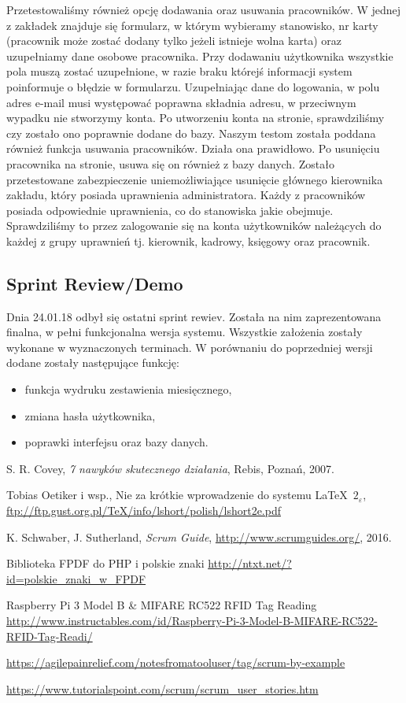 \documentclass[a4paper]{article}
\begin{document}
Przetestowaliśmy również opcję dodawania oraz usuwania pracowników. W jednej z zakładek znajduje się formularz, w którym wybieramy stanowisko, nr karty (pracownik może zostać dodany tylko jeżeli istnieje wolna karta) oraz uzupełniamy dane osobowe pracownika. Przy dodawaniu użytkownika wszystkie pola muszą zostać uzupełnione, w razie braku którejś informacji system poinformuje o błędzie w formularzu. Uzupełniając dane do logowania, w polu adres e-mail musi występować poprawna składnia adresu, w przeciwnym wypadku nie stworzymy konta. Po utworzeniu konta na stronie, sprawdziliśmy czy zostało ono poprawnie dodane do bazy. Naszym testom została poddana również funkcja usuwania pracowników. Działa ona prawidłowo. Po usunięciu pracownika na stronie, usuwa się on również z bazy danych. Zostało przetestowane zabezpieczenie uniemożliwiające usunięcie głównego kierownika zakładu, który posiada uprawnienia administratora.
Każdy z pracowników posiada odpowiednie uprawnienia, co do stanowiska jakie obejmuje. Sprawdziliśmy to przez zalogowanie się na konta użytkowników należących do każdej z grupy uprawnień tj. kierownik, kadrowy, księgowy oraz pracownik.


\subsection{Sprint Review/Demo}
Dnia 24.01.18 odbył się ostatni sprint rewiev. Została na nim zaprezentowana finalna, w pełni funkcjonalna wersja systemu. Wszystkie założenia zostały wykonane w wyznaczonych terminach. W porównaniu do poprzedniej wersji dodane zostały następujące funkcję:
\begin{itemize}
\item funkcja wydruku zestawienia miesięcznego,
\item zmiana hasła użytkownika,
\item poprawki interfejsu oraz bazy danych.
\end{itemize}


\begin{thebibliography}{9}

 S. R. Covey, {\em 7 nawyków skutecznego działania}, Rebis, Poznań, 2007.

 Tobias Oetiker i wsp., Nie za krótkie wprowadzenie do systemu \LaTeX  \ $2_\varepsilon$, \url{ftp://ftp.gust.org.pl/TeX/info/lshort/polish/lshort2e.pdf}

 K. Schwaber, J. Sutherland, {\em Scrum Guide}, \url{http://www.scrumguides.org/}, 2016.

 Biblioteka FPDF do PHP i polskie znaki \url{http://ntxt.net/?id=polskie_znaki_w_FPDF}

 Raspberry Pi 3 Model B \& MIFARE RC522 RFID Tag Reading \\ \url{http://www.instructables.com/id/Raspberry-Pi-3-Model-B-MIFARE-RC522-RFID-Tag-Readi/}

 \url{https://agilepainrelief.com/notesfromatooluser/tag/scrum-by-example}

 \url{https://www.tutorialspoint.com/scrum/scrum_user_stories.htm}

\end{thebibliography}
\end{document}
